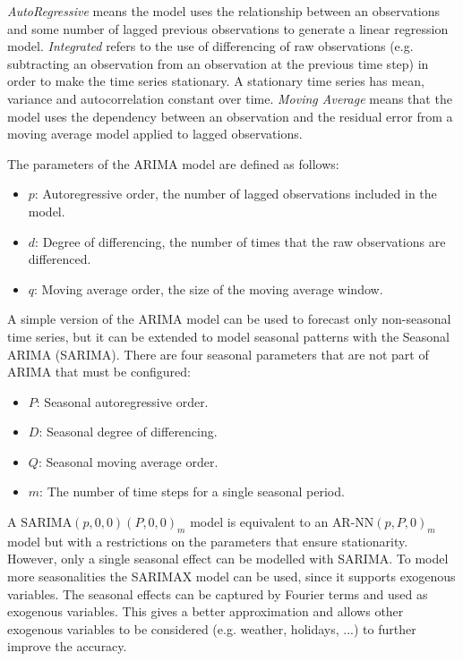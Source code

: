 \emph{AutoRegressive} means the model uses the relationship between an observations and some number of lagged previous observations to generate a linear regression model. \emph{Integrated} refers to the use of differencing of raw observations (e.g. subtracting an observation from an observation at the previous time step) in order to make the time series stationary. A stationary time series has mean, variance and autocorrelation constant over time. \emph{Moving Average} means that the model uses the dependency between an observation and the residual error from a moving average model applied to lagged observations.

The parameters of the ARIMA model are defined as follows:
\begin{itemize}
  \item \( p \): Autoregressive order, the number of lagged observations included in the model.
  \item \( d \): Degree of differencing, the number of times that the raw observations are differenced.
  \item \( q \): Moving average order, the size of the moving average window.
\end{itemize}

A simple version of the ARIMA model can be used to forecast only non-seasonal time series, but it can be extended to model seasonal patterns with the Seasonal ARIMA (SARIMA). There are four seasonal parameters that are not part of ARIMA that must be configured:
\begin{itemize}
  \item \( P \): Seasonal autoregressive order.
  \item \( D \): Seasonal degree of differencing.
  \item \( Q \): Seasonal moving average order.
  \item \( m \): The number of time steps for a single seasonal period.
\end{itemize}
A \( \text{SARIMA}(p,0,0)(P,0,0)_m \) model is equivalent to an \( \text{AR-NN}(p,P,0)_m \) model but with a restrictions on the parameters that ensure stationarity.
However, only a single seasonal effect can be modelled with SARIMA. To model more seasonalities the SARIMAX model can be used, since it supports exogenous variables. The seasonal effects can be captured by Fourier terms and used as exogenous variables. This gives a better approximation and allows other exogenous variables to be considered (e.g. weather, holidays, ...) to further improve the accuracy.

